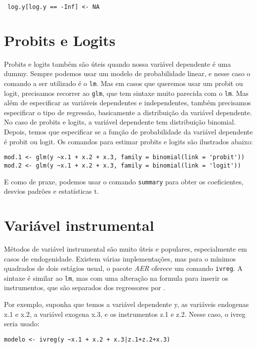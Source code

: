 \documentclass[]{book}
\begin{document}
\begin{verbatim}
 log.y[log.y == -Inf] <- NA
\end{verbatim}

\section{Probits e Logits}\label{probits-e-logits}

Probits e logits também são úteis quando nossa variável dependente é uma
dummy. Sempre podemos usar um modelo de probabilidade linear, e nesse
caso o comando a ser utilizado é o \texttt{lm}. Mas em casos que
queremos usar um probit ou logit, precisamos recorrer ao \texttt{glm},
que tem sintaxe muito parecida com o \texttt{lm}. Mas além de
especificar as variáveis dependentes e independentes, também precisamos
especificar o tipo de regressão, basicamente a distribuição da variável
dependente. No caso de probits e logits, a variável dependente tem
distribuição binomial. Depois, temos que especificar se a função de
probabilidade da variável dependente é probit ou logit. Os comandos para
estimar probits e logits são ilustrados abaixo:

\begin{verbatim}
mod.1 <- glm(y ~x.1 + x.2 + x.3, family = binomial(link = 'probit'))
mod.2 <- glm(y ~x.1 + x.2 + x.3, family = binomial(link = 'logit'))
\end{verbatim}

E como de praxe, podemos usar o comando \texttt{summary} para obter os
coeficientes, desvios padrões e estatísticas t.

\section{Variável instrumental}\label{variavel-instrumental}

Métodos de variável instrumental são muito úteis e populares,
especialmente em casos de endogenidade. Existem várias implementações,
mas para o mínimos quadrados de dois estágios usual, o pacote \emph{AER}
oferece um comando \texttt{ivreg}. A sintaxe é similar ao \texttt{lm},
mas com uma alteração na formula para inserir os instrumentos, que são
separados dos regressores por \textbar{}.

Por exemplo, suponha que temos a variável dependente y, as variáveis
endogenas x.1 e x.2, a variável exogena x.3, e os instrumentos z.1 e
z.2. Nesse caso, o ivreg seria usado:

\begin{verbatim}
modelo <- ivreg(y ~x.1 + x.2 + x.3|z.1+z.2+x.3)
\end{verbatim}
\end{document}
